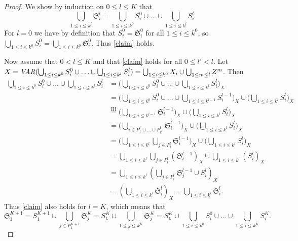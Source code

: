 \lemmato*
\begin{proof}
We show by induction on $0\leq l\leq K$ that 
\begin{equation}\label{claim}
\bigcup_{1\leq i \leq k^l}\mathfrak{S}^{l}_i = \bigcup_{1\leq i\leq k^0}S^0_i\cup\ldots\cup\bigcup_{1\leq i\leq k^l} S^l_i 
\end{equation}
For $l=0$ we have by definition that $S^0_i=\mathfrak{S}^0_i$ for all $1\leq i\leq k^0$, so $\bigcup_{1\leq i\leq k^0}S^0_i = \bigcup_{1\leq i\leq k^0}\mathfrak{S}^0_i$. Thus \eqref{claim} holds.

Now assume that $0<l\leq K$ and that \eqref{claim} holds for all $0\leq l'<l$. 
Let $X = \mathit{VAR}(\bigcup_{1\leq i\leq k^0}S^0_i\cup\ldots\cup\bigcup_{1\leq i\leq k^l} S^l_i)=\bigcup_{1\leq i\leq k^0}X_i \cup \bigcup_{1\leq m \leq l}Z^m$.
Then
\begin{align*}
\bigcup_{1\leq i\leq k^0}S^0_i\cup\ldots\cup\bigcup_{1\leq i\leq k^l} S^l_i
&=\big(\bigcup_{1\leq i\leq k^0}S^0_i\cup\ldots\cup\bigcup_{1\leq i\leq k^l} S^l_i\big)_X\\
&= \big(\bigcup_{1\leq i\leq k^0}S^0_i\cup\ldots\cup\bigcup_{1\leq i\leq k^{l-1}}S^{l-1}_i\big)_X\cup\big(\bigcup_{1\leq i\leq k^l} S^l_i\big)_X\\
&\overset{\text{IH}}=\big(\bigcup_{1\leq i\leq k^{l-1}}\mathfrak{S}^{l-1}_i\big)_X\cup\big(\bigcup_{1\leq i\leq k^l} S^l_i\big)_X\\
&=\big(\bigcup_{i\in P^l_1\cup\ldots \cup P^l_{k^l}}\mathfrak{S}^{l-1}_i\big)_X\cup\big(\bigcup_{1\leq i\leq k^l}S^l_i\big)_X\\
&=\big(\bigcup_{1\leq i\leq k^l}\bigcup_{j\in P^l_i}\mathfrak{S}^{l-1}_i\big)_X\cup\big(\bigcup_{1\leq i\leq k^l}S^l_i\big)_X\\
&=\bigcup_{1\leq i\leq k^l}\bigcup_{j\in P^l_i}(\mathfrak{S}^{l-1}_i)_X\cup\bigcup_{1\leq i\leq k^l}(S^l_i)_X\\
&= \bigcup_{1\leq i\leq k^l}(\bigcup_{j\in P^l_i}\mathfrak{S}^{l-1}_j\cup S^l_i)_X\\
&= (\bigcup_{1\leq i\leq k^l}\mathfrak{S}^l_i)_X = \bigcup_{1\leq i\leq k^l}\mathfrak{S}^l_i.
\end{align*}
Thus \eqref{claim} also holds for $l=K$, which means that 
\[
\mathfrak{S}^{K+1}_1 = S^{K+1}_1 \cup\bigcup_{j\in P^{K+1}_1}\mathfrak{S}^K_j = S^{K}_\texttt{t} \cup\bigcup_{1\leq j\leq k^K}\mathfrak{S}^K_j =
S^K_\texttt{t}\cup\bigcup_{1\leq i\leq k^0}S^0_i\cup\ldots\cup\bigcup_{1\leq i\leq k^K} S^K_i.
\]
\end{proof}

